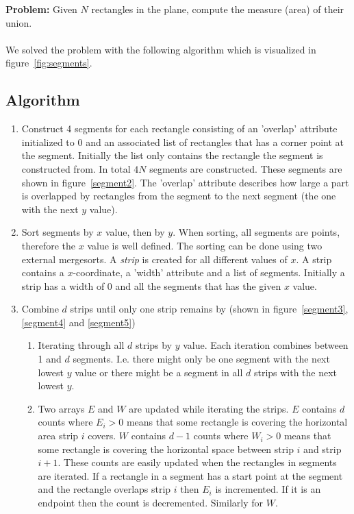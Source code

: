 \textbf{Problem:} Given $N$ rectangles in the plane, compute the measure (area) of their union.
\\
\\We solved the problem with the following algorithm which is visualized in figure~\ref{fig:segments}.

\subsection{Algorithm}

\begin{enumerate}
\item \label{enu:segments} Construct 4 segments for each rectangle consisting of an 'overlap' attribute initialized to 0 and an associated list of rectangles that has a corner point at the segment. Initially the list only contains the rectangle the segment is constructed from. In total $4N$ segments are constructed. These segments are shown in figure~\ref{segment2}. The 'overlap' attribute describes how large a part is overlapped by rectangles from the segment to the next segment (the one with the next $y$ value).
\item \label{enu:sorting} Sort segments by $x$ value, then by $y$. When sorting, all segments are points, therefore the $x$ value is well defined. The sorting can be done using two external mergesorts. A \emph{strip} is created for all different values of $x$. A strip contains a $x$-coordinate, a 'width' attribute and a list of segments. Initially a strip has a width of 0 and all the segments that has the given $x$ value.
\item \label{enum:combine} Combine $d$ strips until only one strip remains by (shown in figure~\ref{segment3}, \ref{segment4} and \ref{segment5})
    \begin{enumerate}
        \item Iterating through all $d$ strips by $y$ value. Each iteration combines between 1 and $d$ segments. I.e. there might only be one segment with the next lowest $y$ value or there might be a segment in all $d$ strips with the next lowest $y$.
        \item Two arrays $E$ and $W$ are updated while iterating the strips. $E$ contains $d$ counts where $E_i>0$ means that some rectangle is covering the horizontal area strip $i$ covers. $W$ contains $d-1$ counts where $W_i>0$ means that some rectangle is covering the horizontal space between strip $i$ and strip $i+1$. These counts are easily updated when the rectangles in segments are iterated. If a rectangle in a segment has a start point at the segment and the rectangle overlaps strip $i$  then $E_i$ is incremented. If it is an endpoint then the count is decremented. Similarly for $W$.

\end{enumerate}
\end{enumerate}

